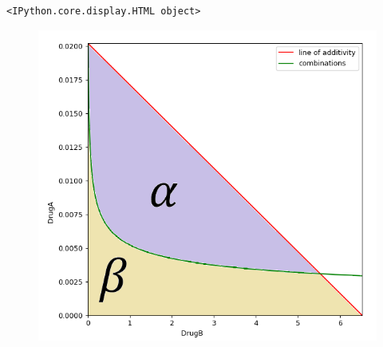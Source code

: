 \documentclass[11pt]{article}
\makeatletter
\def\maxwidth{\ifdim\Gin@nat@width>\linewidth\linewidth
    \else\Gin@nat@width\fi}
\let\Oldincludegraphics\includegraphics
\renewcommand{\includegraphics}[1]{\Oldincludegraphics[width=.8\maxwidth]{#1}}
\makeatother
\begin{document}
    \begin{verbatim}
<IPython.core.display.HTML object>
    \end{verbatim}

    
    

    \begin{figure}
\centering
\includegraphics{../docs/iso.PNG}
\caption{}
\end{figure}
\end{document}
